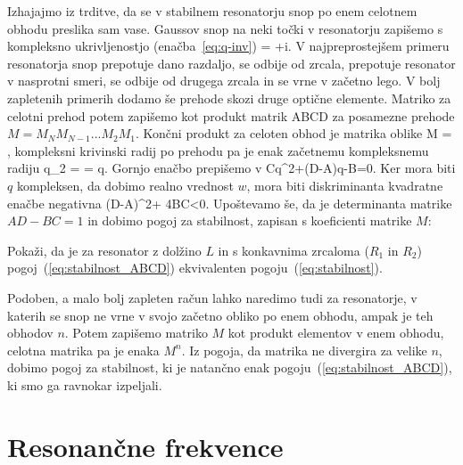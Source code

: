 \noindent
Izhajajmo iz trditve, da se v stabilnem resonatorju snop po enem celotnem obhodu
preslika sam vase. Gaussov snop na neki točki v resonatorju 
zapišemo s kompleksno ukrivljenostjo (enačba~\ref{eq:q-inv})
\beq
{}= +i.
\eeq
V najpreprostejšem primeru resonatorja snop prepotuje dano razdaljo, se odbije od zrcala, prepotuje
resonator v nasprotni smeri, se odbije od drugega zrcala in se vrne v začetno lego. V bolj 
zapletenih primerih dodamo še prehode skozi druge optične elemente. Matriko 
za celotni prehod potem zapišemo kot produkt matrik ABCD za posamezne prehode $M = M_N M_{N-1} ...M_2 M_1$.
Končni produkt za celoten obhod je matrika oblike
\beq
M = \left[\begin{array}{cc}
A & B\\
C & D
\end{array}\right],
\eeq
kompleksni krivinski radij po prehodu pa je enak začetnemu kompleksnemu radiju
\beq
q_2 =  = q.
\eeq
Gornjo enačbo prepišemo v 
\beq
Cq^2+(D-A)q-B=0.
\eeq
Ker mora biti $q$ kompleksen, da dobimo realno vrednost $w$, mora biti diskriminanta
kvadratne enačbe negativna
\beq
(D-A)^2+ 4BC<0.
\eeq
Upoštevamo še, da je determinanta matrike $AD-BC=1$ in dobimo pogoj za 
stabilnost, zapisan s koeficienti matrike $M$:

\begin{definition}
Pokaži, da je za resonator z dolžino $L$ in s konkavnima zrcaloma ($R_1$ in $R_2$) 
pogoj~(\ref{eq:stabilnost_ABCD}) ekvivalenten pogoju~(\ref{eq:stabilnost}).
\end{definition}

\noindent
Podoben, a malo bolj zapleten račun lahko naredimo tudi za resonatorje, v katerih se snop 
ne vrne v svojo začetno obliko po enem obhodu, ampak je teh obhodov $n$. Potem zapišemo
matriko $M$ kot produkt elementov v enem obhodu, celotna matrika pa je enaka $M^n$. Iz pogoja,
da matrika ne divergira za velike $n$, dobimo pogoj za stabilnost, ki je natančno 
enak pogoju~(\ref{eq:stabilnost_ABCD}), ki smo ga ravnokar izpeljali. 

\section{Resonančne frekvence}

